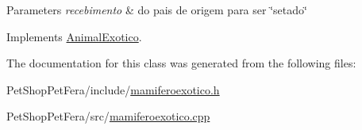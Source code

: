 \begin{DoxyParams}{Parameters}
{\em recebimento} & do pais de origem para ser \char`\"{}setado\char`\"{} \\
\hline
\end{DoxyParams}


Implements \mbox{\hyperlink{class_animal_exotico_a496013ecefb3cafb33537bb4022728e2}{Animal\+Exotico}}.



The documentation for this class was generated from the following files\+:\begin{DoxyCompactItemize}
\item 
Pet\+Shop\+Pet\+Fera/include/\mbox{\hyperlink{mamiferoexotico_8h}{mamiferoexotico.\+h}}\item 
Pet\+Shop\+Pet\+Fera/src/\mbox{\hyperlink{mamiferoexotico_8cpp}{mamiferoexotico.\+cpp}}\end{DoxyCompactItemize}
